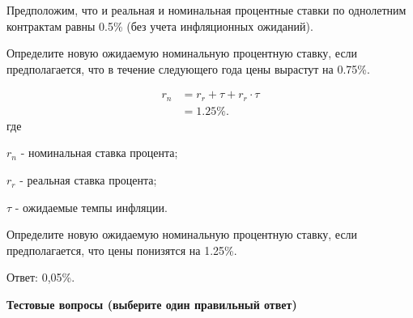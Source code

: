 \documentclass[12pt, table]{exam}
\begin{document}
\begin{questions}
\pagebreak
\question[10] Предположим, что и реальная и номинальная процентные ставки по однолетним контрактам равны 0.5\% (без учета инфляционных ожиданий).
\noaddpoints

\begin{subparts}
	\subpart[5] Определите новую ожидаемую номинальную процентную ставку, если предполагается, что в течение следующего года цены вырастут на 0.75\%.
	
	\begin{solution}[12em]
		\begin{align*}
			r_n&=r_r+\tau + r_r \cdot \tau\\
			&=1.25\%.\nonumber
		\end{align*}
		где

		$r_n$ - номинальная ставка процента;
		
		$r_r$ - реальная ставка процента;
		
		$\tau$ - ожидаемые темпы инфляции.
	\end{solution}
	
	\subpart[5] Определите новую ожидаемую номинальную процентную ставку, если предполагается, что цены понизятся на 1.25\%.
	
	\begin{solution}[12em]
		
		\raggedright
		Ответ: 0,05\%.
	\end{solution}
	
\end{subparts}
\addpoints

\end{questions}

\pagebreak
\noindent\textbf{Тестовые вопросы (выберите один правильный ответ)}
\end{document}
